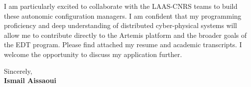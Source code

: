 \documentclass[11pt,a4paper]{article}
\begin{document}
\vspace{0.5em}
\noindent
I am particularly excited to collaborate with the LAAS-CNRS teams to build these autonomic configuration managers. I am confident that my programming proficiency and deep understanding of distributed cyber-physical systems will allow me to contribute directly to the Artemis platform and the broader goals of the EDT program. Please find attached my resume and academic transcripts. I welcome the opportunity to discuss my application further.

\vspace{1.5em}
\noindent
Sincerely, \\[0.5em]
\textbf{Ismail Aissaoui}
\end{document}
